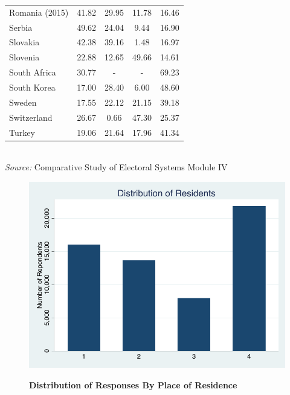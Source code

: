 \documentclass[12pt, titlepage]{article}
\newcommand\e{\emph}
\newcommand\tb{\textbf}
\begin{document}
\begin{table}[h!]
\begin{tabulary}{\linewidth}{l c c c c}
		Romania (2015)&41.82&29.95&11.78&16.46 \\
		Serbia&49.62&24.04&9.44&16.90 \\
		Slovakia&42.38&39.16&1.48&16.97 \\
		Slovenia&22.88&12.65&49.66&14.61 \\
		South Africa&30.77&-&-&69.23 \\
		South Korea&17.00&28.40&6.00&48.60 \\
		Sweden&17.55&22.12&21.15&39.18 \\
		Switzerland&26.67&0.66&47.30&25.37 \\
		Turkey&19.06&21.64&17.96&41.34 \\
		\hline
	\end{tabulary} \\
\e{Source:} Comparative Study of Electoral Systems Module IV 
\label{table2}
\end{table}


\begin{figure}[ht!]    \centering
	{	 \includegraphics[width=\textwidth]{Residents}}
	\caption{\tb{Distribution of Responses By Place of Residence}}\label{figure1}
\end{figure}
\end{document}
